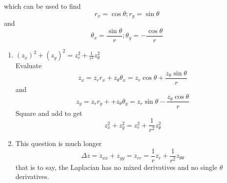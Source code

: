\documentclass[12pt]{article}
\begin{document}
\begin{enumerate}
$$$$
which can be used to find 
$$
r_{x} = \cos \theta; r_{y} = \sin \theta
$$
and
$$
\theta_{x} = \frac{\sin \theta}{r}; \theta_{y} = - \frac{\cos \theta}{r}
$$
\begin{enumerate}
\item $(z_{x})^{2} + (z_{y})^{2} = z_{r}^{2} + \frac{1}{r^{2}}z_{\theta}^{2}$ \\
Evaluate
$$
z_{x} = z_{r} r_{x} + z_{\theta} \theta_{x} = z_{r} \cos \theta + \frac{z_{\theta}\sin \theta}{r}
$$
and
$$
z_{y} = z_{r}r_{y} + + z_{\theta}\theta_{y} = z_{r}\sin \theta - \frac{z_{\theta}\cos \theta}{r}
$$
Square and add to get
$$
z_{x}^{2} + z_{y}^{2} = z_{r}^{2} + \frac{1}{r^{2}}z_{\theta}^{2}
$$
\item This question is much longer \\
$$
\Delta z = z_{xx} + z_{yy} = z_{rr} = \frac{1}{r}z_{r} + \frac{1}{r^{2}}z_{\theta \theta}
$$
that is to say, the Laplacian has no mixed derivatives and no single $\theta$ derivatives.


\end{enumerate}
\end{enumerate}
\end{document}
